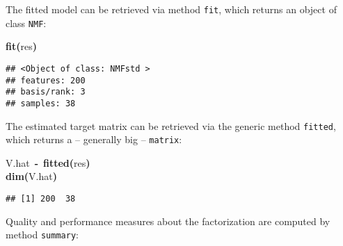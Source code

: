 \documentclass[a4paper]{article}\usepackage{graphicx, color}
\makeatletter
\newcommand{\hlfunctioncall}[1]{\textcolor[rgb]{0.501960784313725,0,0.329411764705882}{\textbf{#1}}}%
\newcommand{\hlkeyword}[1]{\textcolor[rgb]{0,0,0}{\textbf{#1}}}%
\newcommand{\hlassignement}[1]{\textcolor[rgb]{0,0,0}{\textbf{#1}}}%
\newcommand{\hlsymbol}[1]{\textcolor[rgb]{0,0,0}{#1}}%
\newcommand{\hlstd}[1]{\textcolor[rgb]{0,0,0}{#1}}%
\newenvironment{kframe}{%
 \def\FrameCommand##1{\hskip\@totalleftmargin \hskip-\fboxsep
 \colorbox{shadecolor}{##1}\hskip-\fboxsep
     \hskip-\linewidth \hskip-\@totalleftmargin \hskip\columnwidth}%
 \MakeFramed {\advance\hsize-\width
   \@totalleftmargin\z@ \linewidth\hsize
   \@setminipage}}%
 {\par\unskip\endMakeFramed}
\newenvironment{knitrout}{}{} %
\let\code=\texttt
\makeatother
\begin{document}
The fitted model can be retrieved via method \code{fit}, which returns an object of class \code{NMF}:

\begin{knitrout}
\color{fgcolor}\begin{kframe}
\begin{flushleft}
\ttfamily\noindent
\hlfunctioncall{fit}\hlkeyword{(}\hlsymbol{res}\hlkeyword{)}\mbox{}
\normalfont
\end{flushleft}
\begin{verbatim}
## <Object of class: NMFstd >
## features: 200 
## basis/rank: 3 
## samples: 38 
\end{verbatim}
\end{kframe}
\end{knitrout}


The estimated target matrix can be retrieved via the generic method \code{fitted}, which returns a -- generally big -- \code{matrix}:

\begin{knitrout}
\color{fgcolor}\begin{kframe}
\begin{flushleft}
\ttfamily\noindent
\hlsymbol{V.hat}{\ }\hlassignement{\usebox{\hlnormalsizeboxlessthan}-}{\ }\hlfunctioncall{fitted}\hlkeyword{(}\hlsymbol{res}\hlkeyword{)}\hspace*{\fill}\\
\hlstd{}\hlfunctioncall{dim}\hlkeyword{(}\hlsymbol{V.hat}\hlkeyword{)}\mbox{}
\normalfont
\end{flushleft}
\begin{verbatim}
## [1] 200  38
\end{verbatim}
\end{kframe}
\end{knitrout}


Quality and performance measures about the factorization are computed by method \code{summary}:
\end{document}
